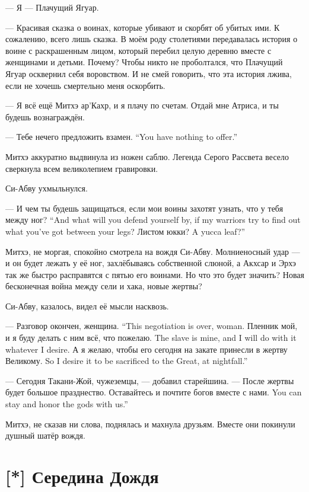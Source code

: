 --- Я --- Плачущий Ягуар.

--- Красивая сказка о воинах, которые убивают и скорбят об убитых ими.
К сожалению, всего лишь сказка.
В моём роду столетиями передавалась история о воине с раскрашенным лицом, который перебил целую деревню вместе с женщинами и детьми.
Почему?
Чтобы никто не проболтался, что Плачущий Ягуар осквернил себя воровством.
И не смей говорить, что эта история лжива, если не хочешь смертельно меня оскорбить.

--- Я всё ещё Митхэ ар'Кахр, и я плачу по счетам.
Отдай мне Атриса, и ты будешь вознаграждён.

{--- Тебе нечего предложить взамен.}
{``You have nothing to offer.''}

Митхэ аккуратно выдвинула из ножен саблю.
Легенда Серого Рассвета весело сверкнула всем великолепием гравировки.

Си-Абву ухмыльнулся.

{--- И чем ты будешь защищаться, если мои воины захотят узнать, что у тебя между ног?}
{``And what will you defend yourself by, if my warriors try to find out what you've got between your legs?}
{Листом юкки?}
{A yucca leaf?''}

Митхэ, не моргая, спокойно смотрела на вождя Си-Абву.
Молниеносный удар --- и он будет лежать у её ног, захлёбываясь собственной слюной, а Акхсар и Эрхэ так же быстро расправятся с пятью его воинами.
Но что это будет значить?
Новая бесконечная война между сели и хака, новые жертвы?

Си-Абву, казалось, видел её мысли насквозь.

{--- Разговор окончен, женщина.}
{``This negotiation is over, woman.}
{Пленник мой, и я буду делать с ним всё, что пожелаю.}
{The slave is mine, and I will do with it whatever I desire.}
{А я желаю, чтобы его сегодня на закате принесли в жертву Великому.}
{So I desire it to be sacrificed to the Great, at nightfall.''}

--- Сегодня Такани-Жой, чужеземцы, --- добавил старейшина.
--- После жертвы будет большое празднество.
{Оставайтесь и почтите богов вместе с нами.}
{You can stay and honor the gods with us.''}

Митхэ, не сказав ни слова, поднялась и махнула друзьям.
Вместе они покинули душный шатёр вождя.

\section{[*] Середина Дождя}

